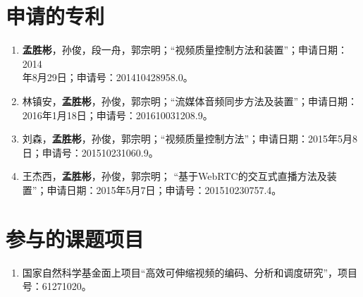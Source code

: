 \section*{申请的专利}
\begin{enumerate}
	\item \textbf{孟胜彬}，孙俊，段一舟，郭宗明；“视频质量控制方法和装置”；申请日期：2014\\年8月29日；申请号：201410428958.0。
	\item 林镇安，\textbf{孟胜彬}，孙俊，郭宗明；“流媒体音频同步方法及装置”；申请日期：2016年1月18日；申请号：201610031208.9。
	\item 刘森，\textbf{孟胜彬}，孙俊，郭宗明；“视频质量控制方法”；申请日期：2015年5月8日；申请号：201510231060.9。
	\item 王杰西，\textbf{孟胜彬}，孙俊，郭宗明； “基于WebRTC的交互式直播方法及装置”；申请日期：2015年5月7日；申请号：201510230757.4。
\end{enumerate}

\section*{参与的课题项目}
\begin{enumerate}
	\item 国家自然科学基金面上项目“高效可伸缩视频的编码、分析和调度研究”，项目号：61271020。
\end{enumerate}